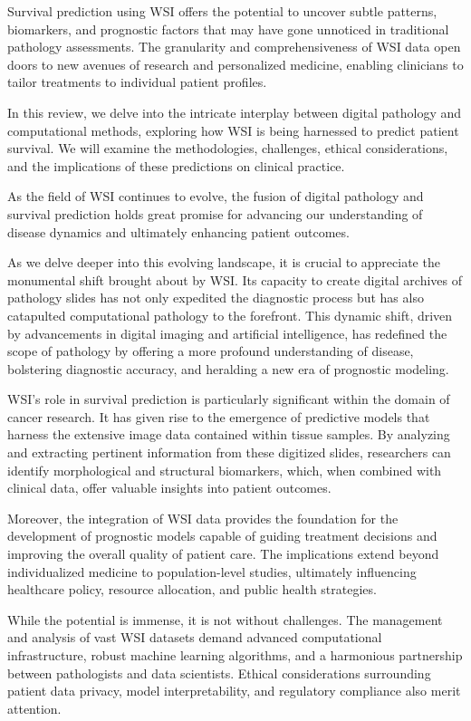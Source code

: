 \documentclass[journal,twoside,web]{ieeecolor}
\begin{document}
Survival prediction using WSI offers the potential to uncover subtle patterns, biomarkers, and prognostic factors that may have gone unnoticed in traditional pathology assessments. The granularity and comprehensiveness of WSI data open doors to new avenues of research and personalized medicine, enabling clinicians to tailor treatments to individual patient profiles.

In this review, we delve into the intricate interplay between digital pathology and computational methods, exploring how WSI is being harnessed to predict patient survival. We will examine the methodologies, challenges, ethical considerations, and the implications of these predictions on clinical practice.

As the field of WSI continues to evolve, the fusion of digital pathology and survival prediction holds great promise for advancing our understanding of disease dynamics and ultimately enhancing patient outcomes.

As we delve deeper into this evolving landscape, it is crucial to appreciate the monumental shift brought about by WSI. Its capacity to create digital archives of pathology slides has not only expedited the diagnostic process but has also catapulted computational pathology to the forefront. This dynamic shift, driven by advancements in digital imaging and artificial intelligence, has redefined the scope of pathology by offering a more profound understanding of disease, bolstering diagnostic accuracy, and heralding a new era of prognostic modeling.

WSI's role in survival prediction is particularly significant within the domain of cancer research. It has given rise to the emergence of predictive models that harness the extensive image data contained within tissue samples. By analyzing and extracting pertinent information from these digitized slides, researchers can identify morphological and structural biomarkers, which, when combined with clinical data, offer valuable insights into patient outcomes.

Moreover, the integration of WSI data provides the foundation for the development of prognostic models capable of guiding treatment decisions and improving the overall quality of patient care. The implications extend beyond individualized medicine to population-level studies, ultimately influencing healthcare policy, resource allocation, and public health strategies.

While the potential is immense, it is not without challenges. The management and analysis of vast WSI datasets demand advanced computational infrastructure, robust machine learning algorithms, and a harmonious partnership between pathologists and data scientists. Ethical considerations surrounding patient data privacy, model interpretability, and regulatory compliance also merit attention.
\end{document}

